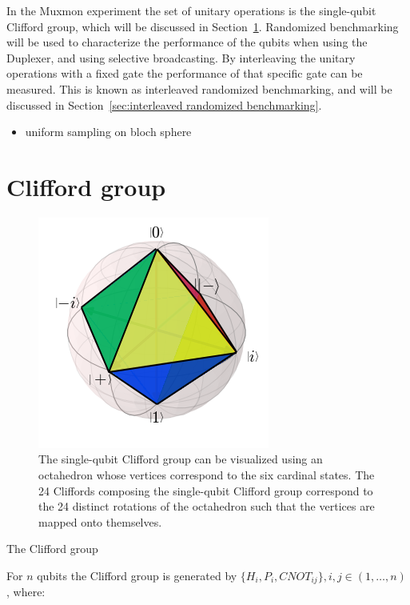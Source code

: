       In the Muxmon experiment the set of unitary operations is the single-qubit Clifford group, which will be discussed in Section~\ref{sec:Clifford group}. Randomized benchmarking will be used to characterize the performance of the qubits when using the Duplexer, and using selective broadcasting. By interleaving the unitary operations with a fixed gate the performance of that specific gate can be measured. This is known as interleaved randomized benchmarking, and will be discussed in Section~\ref{sec:interleaved randomized benchmarking}.

      \begin{itemize}
        \item uniform sampling on bloch sphere
      \end{itemize}

    \section{Clifford group}
      \label{sec:Clifford group}

      \begin{figure}[h]%
        \begin{center}
          \includegraphics[width=.5\textwidth]{../Figures/Randomized benchmarking/Bloch sphere octahedron.png}
        \end{center}
        \caption{The single-qubit Clifford group can be visualized using an octahedron whose vertices correspond to the six cardinal states. The 24 Cliffords composing the single-qubit Clifford group correspond to the 24 distinct rotations of the octahedron such that the vertices are mapped onto themselves.}
        \label{fig:Clifford tetrahedron}
      \end{figure}

      The Clifford group

      For $n$ qubits the Clifford group is generated by $\{H_i, P_i, CNOT_{ij}\}, i, j \in (1, \dots, n)$, where:

